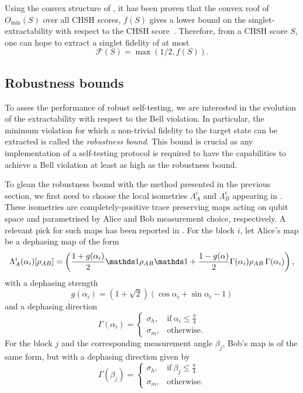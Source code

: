 Using the convex structure of , it has been proven that the convex roof of $O_{\min}(S)$ over all CHSH scores, $f(S)$ gives a lower bound on the singlet-extractability with respect to the CHSH score~\cite{Sekatski2018}.
Therefore, from a CHSH score $S$, one can hope to extract a singlet fidelity of at most 
\begin{equation}
	\mathcal{F}(S)=\max\left(1/2, f(S)\right).
	\label{eq:}
\end{equation}

\subsection{Robustness bounds}

To asses the performance of robust self-testing, we are interested in the evolution of the extractability with respect to the Bell violation.
In particular, the minimum violation for which a non-trivial fidelity to the target state can be extracted is called the \textit{robustness bound}.
This bound is crucial as any implementation of a self-testing protocol is required to have the capabilities to achieve a Bell violation at least as high as the robustness bound.

To glean the robustness bound with the method presented in the previous section, we first need to choose the local isometries $\Lambda_A^i$ and $\Lambda_B^i$ appearing in .
These isometries are completely-positive trace preserving maps acting on qubit space and parametrised by Alice and Bob measurement choice, respectively.
A relevant pick for such maps has been reported in \cite{Kaniewski2016}.
For the block $i$, let Alice's map be a dephasing map of the form
\begin{equation}
	\Lambda_A^i(\alpha_i)[\rho_{AB}] = \left( \frac{1+g(\alpha_i)}{2}\id\rho_{AB}\id+\frac{1-g(\alpha)}{2}\Gamma(\alpha_i)\rho_{AB}\,\Gamma(\alpha_i)\right),
	\label{eq:dephasing_maps}
\end{equation}
with a dephasing strength
\begin{equation}
	g(\alpha_i)=(1+\sqrt{2})(\cos{\alpha_i}+\sin{\alpha_i}-1)
	\label{eq:dephasing_strength}
\end{equation}
and a dephasing direction
\begin{equation}
	\Gamma(\alpha_i) = \begin{cases}
      \sigma_h, & \text{if}\ \alpha_i\leq\frac{\pi}{4} \\
      \sigma_m, & \text{otherwise}.
    \end{cases}
	\label{eq:dephasing_direction_alice}
\end{equation}
For the block $j$ and the corresponding measurement angle $\beta_j$, Bob's map is of the same form, but with a dephasing direction given by
\begin{equation}
	\Gamma(\beta_j) = \begin{cases}
      \sigma_h, & \text{if}\ \beta_j\leq\frac{\pi}{4} \\
      \sigma_m, & \text{otherwise}.
    \end{cases}
	\label{eq:dephasing_direction_bob}
\end{equation}

